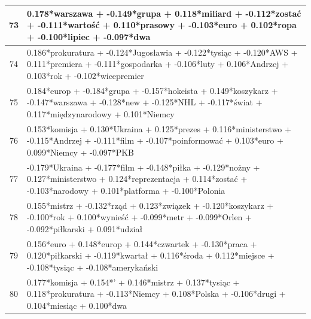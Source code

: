 \documentclass[11pt,a4paper]{article}
\begin{document}
\begin{table}[h]
\begin{tabular}{|c|>{\footnotesize}p{\linewidth}|}
73 & 0.178*warszawa + -0.149*grupa + 0.118*miliard + -0.112*zostać + -0.111*wartość + 0.110*prasowy + -0.103*euro + 0.102*ropa + -0.100*lipiec + -0.097*dwa\\\hline
74 & 0.186*prokuratura + -0.124*Jugosławia + -0.122*tysiąc + -0.120*AWS + 0.111*premiera + -0.111*gospodarka + -0.106*luty + 0.106*Andrzej + 0.103*rok + -0.102*wicepremier\\\hline
75 & 0.184*europ + -0.184*grupa + -0.157*hokeista + 0.149*koszykarz + -0.147*warszawa + -0.128*new + -0.125*NHL + -0.117*świat + 0.117*międzynarodowy + 0.101*Niemcy\\\hline
76 & 0.153*komisja + 0.130*Ukraina + 0.125*prezes + 0.116*ministerstwo + -0.115*Andrzej + -0.111*film + -0.107*poinformować + 0.103*euro + 0.099*Niemcy + -0.097*PKB\\\hline
77 & -0.179*Ukraina + -0.177*film + -0.148*piłka + -0.129*nożny + 0.127*ministerstwo + 0.124*reprezentacja + 0.114*zostać + -0.103*narodowy + 0.101*platforma + -0.100*Polonia\\\hline
78 & 0.155*mistrz + -0.132*rząd + 0.123*związek + -0.120*koszykarz + -0.100*rok + 0.100*wynieść + -0.099*metr + -0.099*Orlen + -0.092*piłkarski + 0.091*udział\\\hline
79 & 0.156*euro + 0.148*europ + 0.144*czwartek + -0.130*praca + 0.120*piłkarski + -0.119*kwartał + 0.116*środa + 0.112*miejsce + -0.108*tysiąc + -0.108*amerykański\\\hline
80 & 0.177*komisja + 0.154*' + 0.146*mistrz + 0.137*tysiąc + 0.118*prokuratura + -0.113*Niemcy + 0.108*Polska + -0.106*drugi + 0.104*miesiąc + 0.100*dwa\\\hline

\end{tabular}
\end{table}
\end{document}
